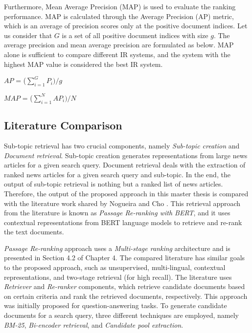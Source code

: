 Furthermore, Mean Average Precision (MAP) \cite{cormack2006statistical} is used to evaluate the ranking performance. MAP is calculated through the Average Precision (AP) metric, which is an average of precision scores only at the positive document indices. Let us consider that $G$ is a set of all positive document indices with size $g$. The average precision and mean average precision are formulated as below. MAP alone is sufficient to compare different \ac{IR} systems, and the system with the highest MAP value is considered the best \ac{IR} system.


\centerline{$AP$ = ($\sum\limits_{i=1}^G P_i) /g$}

\centerline{$MAP$ = ($\sum\limits_{i=1}^N AP_i) /N$}

\subsection{Literature Comparison}

Sub-topic retrieval has two crucial components, namely \textit{Sub-topic creation} and \textit{Document retrieval}. Sub-topic creation generates representations from large news articles for a given search query. Document retrieval deals with the extraction of ranked news articles for a given search query and sub-topic. In the end, the output of sub-topic retrieval is nothing but a ranked list of news articles. Therefore, the output of the proposed approach in this master thesis is compared with the literature work shared by Nogueira and Cho \cite{nogueira2019passage}. This retrieval approach from the literature is known as \textit{Passage Re-ranking with \ac{BERT}}, and it uses contextual representations from \ac{BERT} language models to retrieve and re-rank the text documents.



\textit{Passage Re-ranking} approach uses a \textit{Multi-stage ranking} architecture and is presented in Section 4.2 of Chapter 4. The compared literature has similar goals to the proposed approach, such as unsupervised, multi-lingual, contextual representations, and two-stage retrieval (for high recall). The literature uses \textit{Retriever} and \textit{Re-ranker} components, which retrieve candidate documents based on certain criteria and rank the retrieved documents, respectively. This approach was initially proposed for question-answering tasks. To generate candidate documents for a search query, three different techniques are employed, namely \textit{BM-25}, \textit{Bi-encoder retrieval}, and \textit{Candidate pool extraction}.


